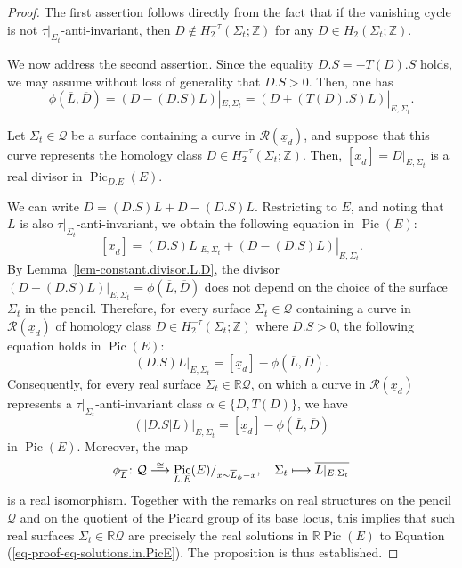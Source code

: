 \documentclass[11pt]{amsart}
\numberwithin{equation}{section}
\theoremstyle{definition}
\theoremstyle{plain}
\theoremstyle{remark}
\newcommand{\R}{\mathbb{R}}
\newcommand{\Z}{\mathbb{Z}}
\DeclareMathOperator{\Pic}{Pic}
\newcommand{\lra}{\longrightarrow}
\def\lowcong{\vbox to 0pt{\vss\hbox{$\scriptstyle\cong$}\vskip-1.5pt}}
\begin{document}
\begin{proof}
  The first assertion follows directly from the fact that if the vanishing cycle is not $\tau|_{\Sigma_t}$-anti-invariant, then $D\notin  H_2^{-\tau}(\Sigma_t;\Z)$ for any $D\in H_2(\Sigma_t;\Z)$.
  
  We now address the second assertion. Since the equality $D.S=-T(D).S$ holds, we may assume without loss of generality that $D.S> 0$.
   Then, one has
  $$\phi\left(\overline{L},\overline{D}\right)=\left(D-(D.S)L\right)|_{E,\Sigma_t}=\left(D+(T(D).S)L\right)|_{E,\Sigma_t}.$$ 
 
  Let $\Sigma_t \in \mathcal{Q}$  be a surface containing a curve in  $\mathcal{R}(\underline{x}_d)$, and suppose that this curve represents the homology class $D\in H_2^{-\tau}(\Sigma_t;\Z)$. Then, $[\underline{x}_d]=D|_{E,\Sigma_t}$ is a real divisor in $\Pic_{D.E}(E)$.
    

We can write  $D=(D.S)L+D-(D.S)L$. Restricting to $E$, and noting that $L$ is also $\tau|_{\Sigma_t}$-anti-invariant, we obtain the following equation in $\Pic(E)$:
  $$\left[\underline{x}_d\right]=(D.S)L|_{E,\Sigma_t}+\left(D-(D.S)L\right)|_{E,\Sigma_t}.$$
 By Lemma~\ref{lem-constant.divisor.L.D}, the divisor $\left(D-(D.S)L\right)|_{E,\Sigma_t}=\phi(\overline{L},\overline{D})$ does not depend on the choice of the surface $\Sigma_t$ in the pencil. 
 Therefore, for every surface $\Sigma_t \in \mathcal{Q}$ containing a curve in $\mathcal{R}(\underline{x}_d)$ of homology class $D\in H_2^{-\tau}(\Sigma_t;\Z)$ where $D.S> 0$, the following equation holds in $\Pic(E)$:
 $$(D.S)L|_{E,\Sigma_t}=[\underline{x}_d]-\phi\left(\overline{L},\overline{D}\right).$$
 Consequently, for every real surface $\Sigma_t \in  \R \mathcal{Q}$, on which a curve in $\mathcal{R}(\underline{x}_d)$ represents a $\tau|_{\Sigma_t}$-anti-invariant class $\alpha\in \{D,T (D)\}$, we have
 \begin{equation} \label{eq-proof-eq-solutions.in.PicE}
     (|D.S|L)|_{E,\Sigma_t}=[\underline{x}_d]-\phi(\overline{L},\overline{D})
 \end{equation}
  in $ \Pic(E)$. Moreover, the map
  $$   \phi_{\overline{L}}\colon  \mathcal{Q} \overset{\lowcong}\lra \Pic_{L.E} (E)/_{x\sim \overline{L}_{\phi}-x}, \quad    \Sigma_t \longmapsto \overline{L|_{E,\Sigma_t}}$$
   is a real isomorphism. Together with the remarks on real structures on the pencil $\mathcal{Q}$ and on the quotient of the Picard group of its base locus, this implies that such real surfaces $\Sigma_t \in  \R \mathcal{Q}$ are precisely the real solutions in  $\R \Pic(E)$ to Equation (\ref{eq-proof-eq-solutions.in.PicE}). The proposition is thus established.
  \end{proof}
\end{document}
